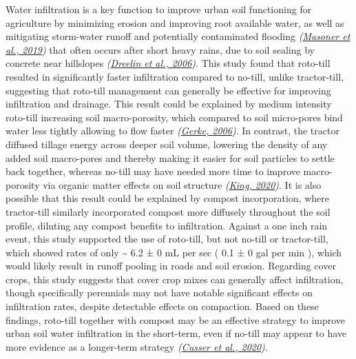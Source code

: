 \documentclass[
  12pt,
]{article}
\begin{document}
Water infiltration is a key function to improve urban soil functioning for agriculture by minimizing erosion and improving root available water, as well as mitigating storm-water runoff and potentially contaminated flooding \emph{(\protect\hyperlink{ref-masoner19}{Masoner et al., 2019})} that often occurs after short heavy rains, due to soil sealing by concrete near hillslopes \emph{(\protect\hyperlink{ref-dreelin06}{Dreelin et al., 2006})}.
This study found that roto-till resulted in significantly faster infiltration compared to no-till, unlike tractor-till, suggesting that roto-till management can generally be effective for improving infiltration and drainage.
This result could be explained by medium intensity roto-till increasing soil macro-porosity, which compared to soil micro-pores bind water less tightly allowing to flow faster \emph{(\protect\hyperlink{ref-gerke06}{Gerke, 2006})}.
In contrast, the tractor diffused tillage energy across deeper soil volume, lowering the density of any added soil macro-pores and thereby making it easier for soil particles to settle back together, whereas no-till may have needed more time to improve macro-porosity via organic matter effects on soil structure \emph{(\protect\hyperlink{ref-king20}{King, 2020})}.
It is also possible that this result could be explained by compost incorporation, where tractor-till similarly incorporated compost more diffusely throughout the soil profile, diluting any compost benefits to infiltration.
Against a one inch rain event, this study supported the use of roto-till, but not no-till or tractor-till, which showed rates of only
\textasciitilde{} 6.2 ±
0 mL per sec
(
0.1 ±
0 gal per min
),
which would likely result in runoff pooling in roads and soil erosion.
Regarding cover crops, this study suggests that cover crop mixes can generally affect infiltration, though specifically perennials may not have notable significant effects on infiltration rates, despite detectable effects on compaction.
Based on these findings, roto-till together with compost may be an effective strategy to improve urban soil water infiltration in the short-term, even if no-till may appear to have more evidence as a longer-term strategy \emph{(\protect\hyperlink{ref-cusser20}{Cusser et al., 2020})}.
\end{document}
